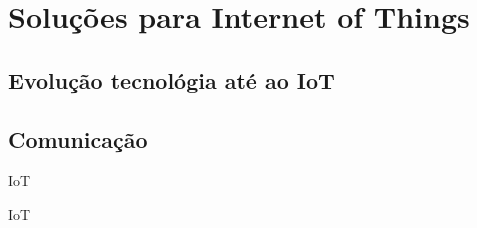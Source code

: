 \chapter{Soluções para Internet of Things}

\section{Evolução tecnológia até ao IoT}

\section{Comunicação}

\ac{IoT}

\ac{IoT}
